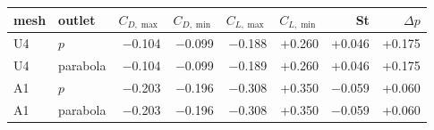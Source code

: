 \begin{tabular}{llrrrrrr}
\toprule
mesh & outlet & $C_{D,\max}$ & $C_{D,\min}$ & $C_{L,\max}$ & $C_{L,\min}$ & St & $\Delta p$ \\
\midrule
U4 & $p$ & $-$0.104 & $-$0.099 & $-$0.188 & +0.260 & +0.046 & +0.175 \\
U4 & parabola & $-$0.104 & $-$0.099 & $-$0.189 & +0.260 & +0.046 & +0.175 \\
A1 & $p$ & $-$0.203 & $-$0.196 & $-$0.308 & +0.350 & $-$0.059 & +0.060 \\
A1 & parabola & $-$0.203 & $-$0.196 & $-$0.308 & +0.350 & $-$0.059 & +0.060 \\
\bottomrule
\end{tabular}
